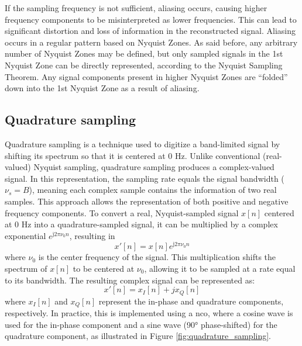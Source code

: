 If the sampling frequency is not sufficient, aliasing occurs, causing higher frequency components to be misinterpreted as lower frequencies. This can lead to significant distortion and loss of information in the reconstructed signal. Aliasing occurs in a regular pattern based on Nyquist Zones. As said before, any arbitrary number of Nyquist Zones may be defined, but only sampled signals in the 1st Nyquist Zone can be directly represented, according to the Nyquist Sampling Theorem. Any signal components present in higher Nyquist Zones are ``folded'' down into the 1st Nyquist Zone as a result of aliasing. 

\subsection{Quadrature sampling}
\label{sec:quadrature_sampling}
Quadrature sampling is a technique used to digitize a band-limited signal by shifting its spectrum so that it is centered at 0 Hz. Unlike conventional (real-valued) Nyquist sampling, quadrature sampling produces a complex-valued signal. In this representation, the sampling rate equals the signal bandwidth ($\nu_s = B$), meaning each complex sample contains the information of two real samples. This approach allows the representation of both positive and negative frequency components. To convert a real, Nyquist-sampled signal $x[n]$ centered at 0 Hz into a quadrature-sampled signal, it can be multiplied by a complex exponential $e^{\mathrm{j}2\pi \nu_0 n}$, resulting in
\begin{equation}
	\label{eq:quadrature_sampling}
	x'[n] = x[n] e^{\mathrm{j}2\pi \nu_0 n}
\end{equation}
where $\nu_0$ is the center frequency of the signal. This multiplication shifts the spectrum of $x[n]$ to be centered at $\nu_0$, allowing it to be sampled at a rate equal to its bandwidth. The resulting complex signal can be represented as:
\begin{equation}
	x'[n] = x_I[n] + j x_Q[n]
	\label{eq:complex_signal}
\end{equation}
where $x_I[n]$ and $x_Q[n]$ represent the in-phase and quadrature components, respectively. In practice, this is implemented using a \gls{nco}, where a cosine wave is used for the in-phase component and a sine wave (90° phase-shifted) for the quadrature component, as illustrated in Figure \ref{fig:quadrature_sampling}.
